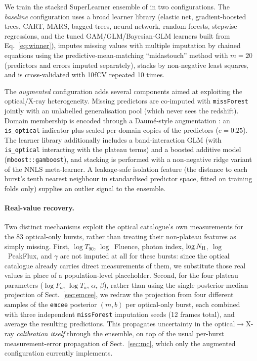 \documentclass{aa}
\newcommand{\Fa}{F_a}
\newcommand{\Ta}{T_a}
\newcommand{\NH}{N_{\rm H}}
\begin{document}
We train the stacked SuperLearner ensemble of \citet[Sect.~4.4]{narendra2025} in two
configurations. The \emph{baseline} configuration uses a broad learner library
(elastic net, gradient-boosted trees, CART, MARS, bagged trees, neural network,
random forests, stepwise regressions, and the tuned GAM/GLM/Bayesian-GLM learners
built from Eq.~\ref{eq:winner}), imputes missing values with multiple imputation by
chained equations \citep[MICE;][]{vanbuuren2011} using the predictive-mean-matching
``midastouch'' method with $m=20$ (predictors and errors imputed separately), stacks
by non-negative least squares, and is cross-validated with 10fCV repeated 10 times.

The \emph{augmented} configuration adds several components aimed at exploiting the
optical/X-ray heterogeneity. Missing predictors are co-imputed with
\texttt{missForest} \citep{stekhoven2012missforest} jointly with an unlabelled
generalisation pool (which never sees the redshift). Domain membership is encoded
through a Daum\'e-style augmentation \citep{daume2007}: an \texttt{is\_optical}
indicator plus scaled per-domain copies of the predictors ($c=0.25$). The learner
library additionally includes a band-interaction GLM (with \texttt{is\_optical}
interacting with the plateau terms) and a boosted additive model
(\texttt{mboost::gamboost}), and stacking is performed with a non-negative ridge
variant of the NNLS meta-learner. A leakage-safe isolation feature (the distance to
each burst's tenth nearest neighbour in standardised predictor space, fitted on
training folds only) supplies an outlier signal to the ensemble.

\paragraph{Real-value recovery.} Two distinct mechanisms exploit the optical
catalogue's own measurements for the 83 optical-only bursts, rather than treating
their non-plateau features as simply missing. First, $\log T_{90}$,
$\log$~Fluence, photon index, $\log \NH$, $\log$~PeakFlux, and $\gamma$ are not
imputed at all for these bursts: since the optical catalogue already carries direct
measurements of them, we substitute those real values in place of a population-level
placeholder. Second, for the four plateau parameters ($\log \Fa$, $\log \Ta$,
$\alpha$, $\beta$), rather than using the single posterior-median projection of
Sect.~\ref{sec:emcee}, we redraw the projection from four different samples of the
\texttt{emcee} posterior $(m,b)$ per optical-only burst, each combined with three
independent \texttt{missForest} imputation seeds (12 frames total), and average the
resulting predictions. This propagates uncertainty in the optical$\rightarrow$X-ray
\emph{calibration itself} through the ensemble, on top of the usual per-burst
measurement-error propagation of Sect.~\ref{sec:mc}, which only the augmented
configuration currently implements.
\end{document}
